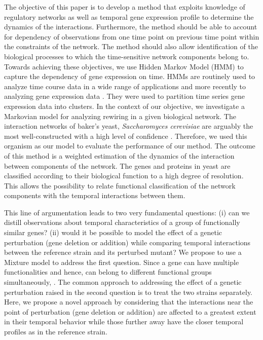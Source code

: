 \documentclass{bioinfo}
\begin{document}
The objective of this paper is to develop a method that exploits knowledge of regulatory networks as well as temporal gene expression profile to determine the dynamics of the interactions. Furthermore, the method should be able to account for dependency of observations from one time point on previous time point within the constraints of the network. 
The method should also allow identification of the biological processes to which the time-sensitive network components belong to. Towards achieving these objectives, we use Hidden Markov Model (HMM) to capture the dependency of gene expression on time. HMMs are routinely used to analyze time course data in a wide range of applications \todo{[MacDonald1997]} and more recently to analyzing gene expression data . 
They were used to partition time series gene expression data into clusters. In the context of our objective, we investigate a Markovian model for analyzing rewiring in a given biological network. The interaction networks of baker's yeast, {\it Saccharomyces cerevisiae} are arguably the most well-constructed with a high level of confidence \todo{[Petranovic2009]}. Therefore, we used this organism as our model to evaluate the performance of our method. 
The outcome of this method is a weighted estimation of the dynamics of the interaction between components of the network. The genes and proteins in yeast are classified according to their biological function \todo{[Mewes2007]} to a high degree of resolution. This allows the possibility to relate functional classification of the network components with the temporal interactions between them.

This line of argumentation leads to two very fundamental questions: (i) can we distill observations about temporal characteristics of a group of functionally similar genes? (ii) would it be possible to model the effect of a genetic perturbation (gene deletion or addition) while comparing temporal interactions between the reference strain and its perturbed mutant? 
We propose to use a Mixture model to address the first question. Since a gene can have multiple functionalities and hence, can belong to different functional groups simultaneously, . The common approach to addressing the effect of a genetic perturbation raised in the second question is to treat the two strains separately. 
Here, we propose a novel approach by considering that the interactions near the point of perturbation (gene deletion or addition) are affected to a greatest extent in their temporal behavior while those further away have the closer temporal profiles as in the reference strain.
\end{document}
